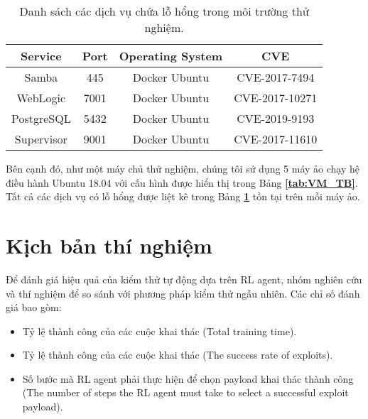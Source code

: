 \begin{table}[!h]
    \centering
    \caption{Danh sách các dịch vụ chứa lỗ hổng trong môi trường thử nghiệm.}
    \label{tab:ServiceTB}
    \begin{tabular}{|c|c|c|c|}
    \hline
    \textbf{Service}     & \textbf{Port}  & \textbf{Operating System}  & \textbf{CVE}  \\ 
    \hline
    Samba       & 445   & Docker Ubuntu  & CVE-2017-7494      \\ 
    \hline
    WebLogic    & 7001  & Docker Ubuntu  & CVE-2017-10271      \\ 
    \hline
    PostgreSQL  & 5432  & Docker Ubuntu  & CVE-2019-9193     \\ 
    \hline
    Supervisor  & 9001  & Docker Ubuntu  & CVE-2017-11610    \\ 
    \hline
    \end{tabular}
\end{table}

Bên cạnh đó, như một máy chủ thử nghiệm, chúng tôi sử dụng 5 máy ảo chạy hệ điều hành Ubuntu 18.04 với cấu hình được hiển thị trong Bảng \textbf{\ref{tab:VM_TB}}. Tất cả các dịch vụ có lỗ hổng được liệt kê trong Bảng \textbf{\ref{tab:ServiceTB}} tồn tại trên mỗi máy ảo.

\section{Kịch bản thí nghiệm}

Để đánh giá hiệu quả của kiểm thử tự động dựa trên RL agent, nhóm nghiên cứu và thí nghiệm để so sánh với phương pháp kiểm thử ngẫu nhiên. Các chỉ số đánh giá bao gòm:

\begin{itemize}
    \item Tỷ lệ thành công của các cuộc khai thác (Total training time).
    \item Tỷ lệ thành công của các cuộc khai thác (The success rate of exploits).
    \item Số bước mà RL agent phải thực hiện để chọn payload khai thác thành công (The number of steps the RL agent must take to select a successful exploit payload).
\end{itemize}


